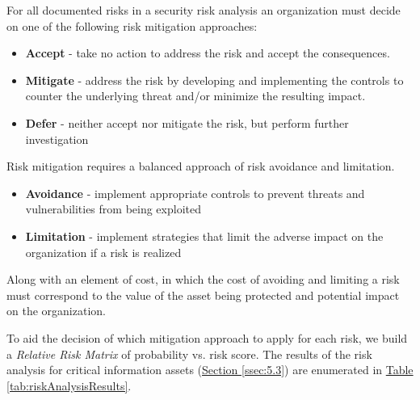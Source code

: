 \documentclass[12pt]{article} %
\newcommand{\hypertableref}[1]{\hyperref[#1]{Table \ref{#1}}}
\newcommand{\hypersectionref}[1]{\hyperref[#1]{Section \ref{#1}}}
\begin{document}
{For all documented risks in a security risk analysis an organization must decide on one of the following risk mitigation approaches:

\begin{itemize}
	\item \textbf{Accept} - take no action to address the risk and accept the consequences.
	\item \textbf{Mitigate} - address the risk by developing and implementing the controls to counter the underlying threat and/or minimize the resulting impact.
	\item \textbf{Defer} - neither accept nor mitigate the risk, but perform further investigation
\end{itemize}

Risk mitigation requires a balanced approach of risk avoidance and limitation.

\begin{itemize}
	\item \textbf{Avoidance} - implement appropriate controls to prevent threats and vulnerabilities from being exploited
	\item \textbf{Limitation} - implement strategies that limit the adverse impact on the organization if a risk is realized
\end{itemize}

Along with an element of cost, in which the cost of avoiding and limiting a risk must correspond to the value of the asset being protected and potential impact on the organization.

To aid the decision of which mitigation approach to apply for each risk, we build a \textit{Relative Risk Matrix} of probability vs. risk score. The results of the risk analysis for critical information assets (\hypersectionref{ssec:5.3}) are enumerated in \hypertableref{tab:riskAnalysisResults}.

}
\end{document}
